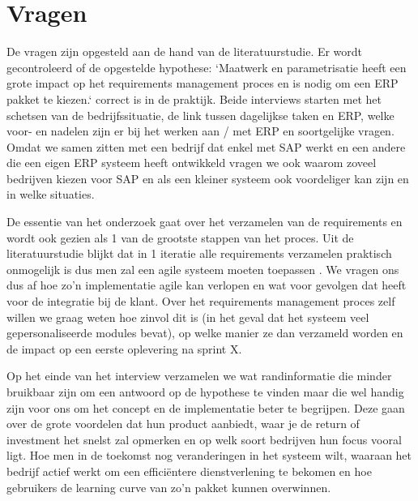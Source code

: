 
\chapter{Vragen}
\label{ch:vraagstelling}

De vragen zijn opgesteld aan de hand van de literatuurstudie. Er wordt gecontroleerd of de opgestelde hypothese: `Maatwerk en parametrisatie heeft een grote impact op het requirements management proces en is nodig om een ERP pakket te kiezen.` correct is in de praktijk. Beide interviews starten met het schetsen van de bedrijfssituatie, de link tussen dagelijkse taken en ERP, welke voor- en nadelen zijn er bij het werken aan / met ERP en soortgelijke vragen. Omdat we samen zitten met een bedrijf dat enkel met SAP werkt en een andere die een eigen ERP systeem heeft ontwikkeld vragen we ook waarom zoveel bedrijven kiezen voor SAP en als een kleiner systeem ook voordeliger kan zijn en in welke situaties. 

De essentie van het onderzoek gaat over het verzamelen van de requirements en wordt ook gezien als 1 van de grootste stappen van het proces. Uit de literatuurstudie blijkt dat in 1 iteratie alle requirements verzamelen praktisch onmogelijk is dus men zal een agile systeem moeten toepassen \autocite{Vollmer2016}. We vragen ons dus af hoe zo'n implementatie agile kan verlopen en wat voor gevolgen dat heeft voor de integratie bij de klant. Over het requirements management proces zelf willen we graag weten hoe zinvol dit is (in het geval dat het systeem veel gepersonaliseerde modules bevat), op welke manier ze dan verzameld worden en de impact op een eerste oplevering na sprint X.

Op het einde van het interview verzamelen we wat randinformatie die minder bruikbaar zijn om een antwoord op de hypothese te vinden maar die wel handig zijn voor ons om het concept en de implementatie beter te begrijpen. Deze gaan over de grote voordelen dat hun product aanbiedt, waar je de return of investment het snelst zal opmerken en op welk soort bedrijven hun focus vooral ligt. Hoe men in de toekomst nog veranderingen in het systeem wilt, waaraan het bedrijf actief werkt om een efficiëntere dienstverlening te bekomen en hoe gebruikers de learning curve van zo'n pakket kunnen overwinnen.